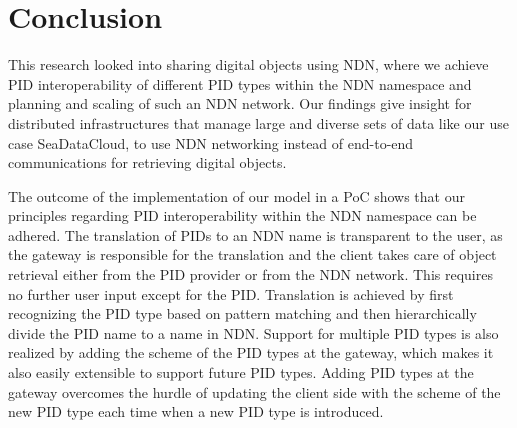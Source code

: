 \section{Conclusion}\label{conc}



This research looked into sharing digital objects using NDN, where we achieve PID interoperability of different PID types within the NDN namespace and planning and scaling of such an NDN network. Our findings give insight for distributed infrastructures that manage large and diverse sets of data like our use case SeaDataCloud, to use NDN networking instead of end-to-end communications for retrieving digital objects.

The outcome of the implementation of our model in a PoC shows that our principles regarding PID interoperability within the NDN namespace can be adhered. The translation of PIDs to an NDN name is transparent to the user, as the gateway is responsible for the translation and the client takes care of object retrieval either from the PID provider or from the NDN network. This requires no further user input except for the PID. Translation is achieved by first recognizing the PID type based on pattern matching and then hierarchically divide the PID name to a name in NDN. Support for multiple PID types is also realized by adding the scheme of the PID types at the gateway, which makes it also easily extensible to support future PID types. Adding PID types at the gateway overcomes the hurdle of updating the client side with the scheme of the new PID type each time when a new PID type is introduced.

